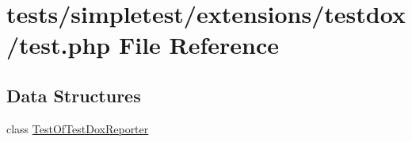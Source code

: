 \hypertarget{test_8php}{\section{tests/simpletest/extensions/testdox/test.php File Reference}
\label{test_8php}
}
\subsection*{Data Structures}
\begin{DoxyCompactItemize}
\item 
class \hyperlink{class_test_of_test_dox_reporter}{Test\-Of\-Test\-Dox\-Reporter}
\end{DoxyCompactItemize}
